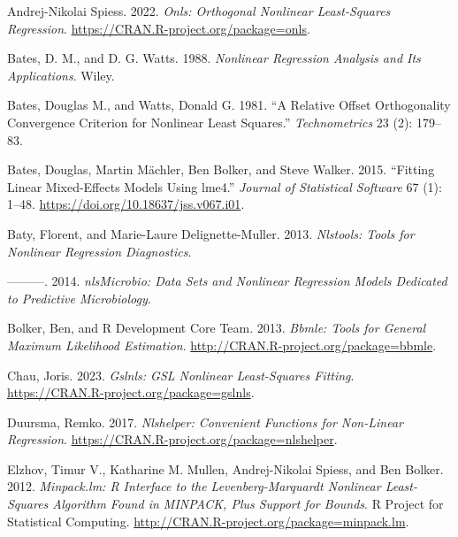 \documentclass[
]{article}
\newlength{\cslhangindent}
\newlength{\cslentryspacingunit} %
\newenvironment{CSLReferences}[2] %
 {%
  \setlength{\parindent}{0pt}
  \ifodd #1
  \let\oldpar\par
  \def\par{\hangindent=\cslhangindent\oldpar}
  \fi
  \setlength{\parskip}{#2\cslentryspacingunit}
 }%
 {}
\begin{document}
\hypertarget{refs}{}
\begin{CSLReferences}{1}{0}
\leavevmode{}%
Andrej-Nikolai Spiess. 2022. \emph{Onls: Orthogonal Nonlinear
Least-Squares Regression}.
\url{https://CRAN.R-project.org/package=onls}.

\leavevmode{}%
Bates, D. M., and D. G. Watts. 1988. \emph{Nonlinear Regression Analysis
and Its Applications}. Wiley.

\leavevmode{}%
Bates, Douglas M., and Watts, Donald G. 1981. {``A Relative Offset
Orthogonality Convergence Criterion for Nonlinear Least Squares.''}
\emph{Technometrics} 23 (2): 179--83.

\leavevmode{}%
Bates, Douglas, Martin Mächler, Ben Bolker, and Steve Walker. 2015.
{``Fitting Linear Mixed-Effects Models Using {lme4}.''} \emph{Journal of
Statistical Software} 67 (1): 1--48.
\url{https://doi.org/10.18637/jss.v067.i01}.

\leavevmode{}%
Baty, Florent, and Marie-Laure Delignette-Muller. 2013. \emph{Nlstools:
Tools for Nonlinear Regression Diagnostics}.

\leavevmode{}%
---------. 2014. \emph{nlsMicrobio: Data Sets and Nonlinear Regression
Models Dedicated to Predictive Microbiology}.

\leavevmode{}%
Bolker, Ben, and R Development Core Team. 2013. \emph{Bbmle: Tools for
General Maximum Likelihood Estimation}.
\url{http://CRAN.R-project.org/package=bbmle}.

\leavevmode{}%
Chau, Joris. 2023. \emph{Gslnls: GSL Nonlinear Least-Squares Fitting}.
\url{https://CRAN.R-project.org/package=gslnls}.

\leavevmode{}%
Duursma, Remko. 2017. \emph{Nlshelper: Convenient Functions for
Non-Linear Regression}.
\url{https://CRAN.R-project.org/package=nlshelper}.

\leavevmode{}%
Elzhov, Timur V., Katharine M. Mullen, Andrej-Nikolai Spiess, and Ben
Bolker. 2012. \emph{Minpack.lm: R Interface to the Levenberg-Marquardt
Nonlinear Least-Squares Algorithm Found in MINPACK, Plus Support for
Bounds}. R Project for Statistical Computing.
\url{http://CRAN.R-project.org/package=minpack.lm}.


\end{CSLReferences}
\end{document}
